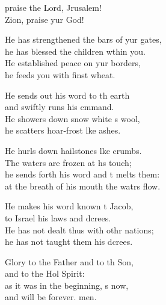 \begin{psalmverse}
  \begin{patverse}
     praise the Lord, Jrusalem!\Med\\
    Zion, praise yur God!
    
    He has strengthened the bars of yur gates,\Med\\
    he has blessed the children w\pointup{\i}thin you.\\
    He established peace on yur borders,\Med\\
    he feeds you with finst wheat.
    
    He sends out his word to th earth\Med\\
    and swiftly runs his cmmand.\\
    He showers down snow white s wool,\Med\\
    he scatters hoar-frost l\pointup{\i}ke ashes.
    
    He hurls down hailstones l\pointup{\i}ke crumbs.\Med\\
    The waters are frozen at h\pointup{\i}s touch;\\
    he sends forth his word and \pointup{\i}t melts them:\Med\\
    at the breath of his mouth the watrs flow.
    
    He makes his word known t Jacob,\Med\\
    to Israel his laws and dcrees.\\
    He has not dealt thus with othr nations;\Med\\
    he has not taught them his dcrees.
    
    Glory to the Father and to th Son,\Med\\
    and to the Hol Spirit:\\
    as it was in the beginning, \pointup{\i}s now,\Med\\
    and will be forever. men.
  \end{patverse}
\end{psalmverse}
